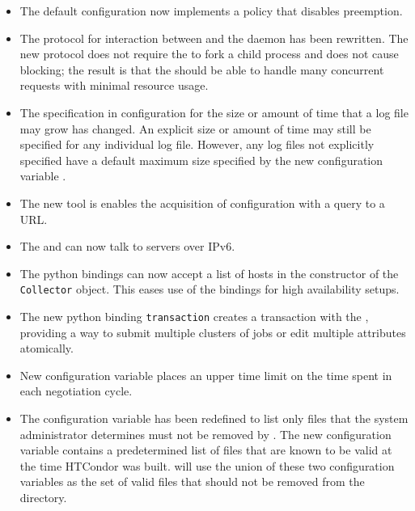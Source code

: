 \begin{itemize}

\item The default configuration now implements a policy 
that disables preemption.

\item The protocol for interaction between  and the 
 daemon has been rewritten.
The new protocol does not require the  to fork a child process 
and does not cause blocking; 
the result is that the  should be able to handle
many concurrent  requests with minimal resource usage.

\item The specification in configuration for the size or amount of time
that a log file may grow has changed.
An explicit size or amount of time may still be specified for any
individual log file.
However, any log files not explicitly specified have a default maximum
size specified by the new configuration variable 
.

\item The new  tool is enables the  acquisition of
configuration with a query to a URL.

\item The  and  can now talk to
servers over IPv6.

\item The python bindings can now accept a list of  hosts
in the constructor of the \texttt{Collector} object.  
This eases use of the bindings for high availability setups.

\item The new python binding \texttt{transaction} creates a transaction
with the ,
providing a way to submit multiple clusters of jobs
or edit multiple attributes atomically.

\item New configuration variable 
places an upper time limit on the time spent in each negotiation cycle.

\item The configuration variable  has been redefined
to list only files that the system administrator determines must not
be removed by .
The new configuration variable  contains 
a predetermined list of files that are known to be valid at 
the time HTCondor was built. 
 will use the union of these two configuration variables 
as the set of valid files that should not be removed from the 
directory.


\end{itemize}
